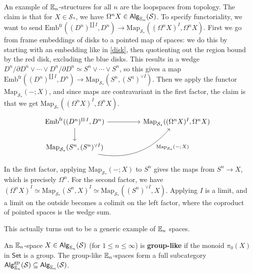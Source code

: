    \begin{example}
       An example of $\mathbb{E}_n $-structures for all $n$ are the loopspaces from topology. The claim is that for $X \in \mathcal{S} _*$, we have $\Omega^n X \in \mathsf{Alg} _{\mathbb{E}_n }(\mathcal{S} )$. To specify functoriality, we want to send
       $\mathrm{Emb}^{\mathrm{fr}}((D^n )^{\amalg \, I},D^n ) \to \mathrm{Map}_{\mathcal{S} _*}((\Omega^n X)^I,\Omega^n X)$. 
       First we go from frame embeddings of disks to a pointed map of spaces: we do this by starting with an embedding like in \cref{disk}, then quotienting out the region bound by the red disk, excluding the blue disks. This results in a wedge $ D^n  / \partial D^n  \vee \cdots  \vee D^n  / \partial D^n  \simeq S^n  \vee \cdots \vee S^n $, so this gives a map $\mathrm{Emb}^{\mathrm{fr}}((D^n )^{\amalg \, I},D^n ) \to \mathrm{Map}_{\mathcal{S} _*}(S^n ,(S^n )^{\vee I})$. Then we apply the functor $\mathrm{Map}_{\mathcal{S} _*}(-; X)$, and since maps are contravariant in the first factor, the claim is that we get $\mathrm{Map}_{\mathcal{S} _*}((\Omega^n X)^I,\Omega^n X)$. \[
       \begin{tikzcd}
\mathrm{Emb}^{\mathrm{fr}}((D^n )^{\amalg \, I},D^n )\arrow[rr] \arrow[d]          &  & \mathrm{Map}_{\mathcal{S} _*}((\Omega^n X)^I,\Omega^n X)\\
\mathrm{Map}_{\mathcal{S} _*}(S^n ,(S^n )^{\vee I})\arrow[rru, "\mathrm{Map}_{\mathcal{S} _*}(-;\, X)"', bend right, near end] &  &   
\end{tikzcd}
       \] In the first factor, applying $\mathrm{Map}_{ \mathcal{S_*}} (-;X)$ to $S^n $ gives the maps from $S^n  \to X$, which is precisely $\Omega^n $. For the second factor, we have $(\Omega^n X)^I \simeq  \mathrm{Map}_{\mathcal{S} _*}(S^n ,X)^I \simeq  \mathrm{Map}_{\mathcal{S} _*}((S^n )^{\vee I},X)$. Applying $I$ is a limit, and a limit on the outside becomes a colimit on the left factor, where the coproduct of pointed spaces is the wedge sum.

   \end{example}
   This actually turns out to be a generic example of $\mathbb{E}_n $ spaces.
   \begin{definition}[]
       An $\mathbb{E}_n $-space $X \in \mathsf{Alg} _{\mathbb{E}_n }(\mathcal{S} )$ (for $1 \leq n \leq \infty$) is \textbf{group-like} if the monoid $\pi_0(X)$ in $\mathsf{Set} $ is a group. The group-like $\mathbb{E}_n $-spaces form a full subcategory $\mathsf{Alg} _{\mathbb{E}_n }^{\mathrm{gp}}(\mathcal{S} ) \subseteq \mathsf{Alg} _{\mathbb{E}_n }(\mathcal{S} )$.
   \end{definition}

